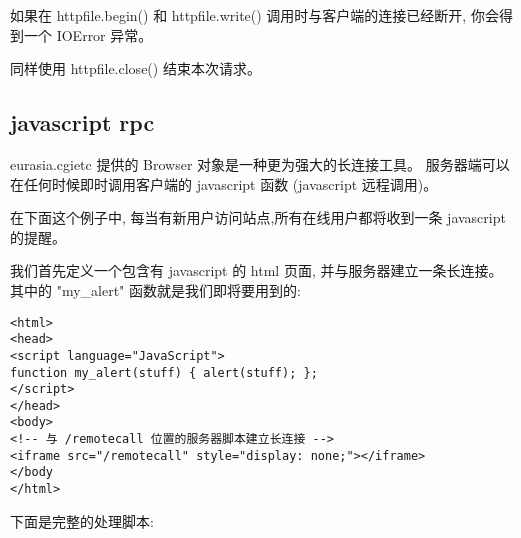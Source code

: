 \documentclass{manual}
\begin{document}
如果在 httpfile.begin() 和 httpfile.write() 调用时与客户端的连接已经断开,
你会得到一个 IOError 异常。

同样使用 httpfile.close() 结束本次请求。



\subsection{javascript rpc}

eurasia.cgietc 提供的 Browser 对象是一种更为强大的长连接工具。
服务器端可以在任何时候即时调用客户端的 javascript 函数 (javascript 远程调用)。

在下面这个例子中, 每当有新用户访问站点,所有在线用户都将收到一条 javascript 的提醒。

我们首先定义一个包含有 javascript 的 html 页面, 并与服务器建立一条长连接。
其中的 "my_alert" 函数就是我们即将要用到的:

\begin{verbatim}
<html>
<head>
<script language="JavaScript">
function my_alert(stuff) { alert(stuff); };
</script>
</head>
<body>
<!-- 与 /remotecall 位置的服务器脚本建立长连接 -->
<iframe src="/remotecall" style="display: none;"></iframe>
</body
</html>
\end{verbatim}

下面是完整的处理脚本:
\end{document}
